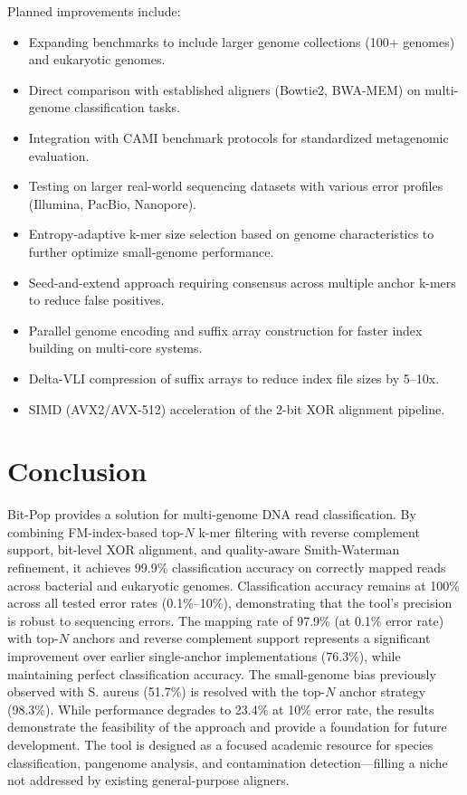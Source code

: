 \documentclass[utf8]{article}
\begin{document}
Planned improvements include:
\begin{itemize}
    \item Expanding benchmarks to include larger genome collections (100+ genomes) and eukaryotic genomes.
    \item Direct comparison with established aligners (Bowtie2, BWA-MEM) on multi-genome classification tasks.
    \item Integration with CAMI benchmark protocols for standardized metagenomic evaluation.
    \item Testing on larger real-world sequencing datasets with various error profiles (Illumina, PacBio, Nanopore).
    \item Entropy-adaptive k-mer size selection based on genome characteristics to further optimize small-genome performance.
    \item Seed-and-extend approach requiring consensus across multiple anchor k-mers to reduce false positives.
    \item Parallel genome encoding and suffix array construction for faster index building on multi-core systems.
    \item Delta-VLI compression of suffix arrays to reduce index file sizes by 5--10x.
    \item SIMD (AVX2/AVX-512) acceleration of the 2-bit XOR alignment pipeline.
\end{itemize}

\section{Conclusion}

Bit-Pop provides a solution for multi-genome DNA read classification. By combining FM-index-based top-$N$ k-mer filtering with reverse complement support, bit-level XOR alignment, and quality-aware Smith-Waterman refinement, it achieves 99.9\% classification accuracy on correctly mapped reads across bacterial and eukaryotic genomes. Classification accuracy remains at 100\% across all tested error rates (0.1\%--10\%), demonstrating that the tool's precision is robust to sequencing errors. The mapping rate of 97.9\% (at 0.1\% error rate) with top-$N$ anchors and reverse complement support represents a significant improvement over earlier single-anchor implementations (76.3\%), while maintaining perfect classification accuracy. The small-genome bias previously observed with S. aureus (51.7\%) is resolved with the top-$N$ anchor strategy (98.3\%). While performance degrades to 23.4\% at 10\% error rate, the results demonstrate the feasibility of the approach and provide a foundation for future development. The tool is designed as a focused academic resource for species classification, pangenome analysis, and contamination detection---filling a niche not addressed by existing general-purpose aligners.
\end{document}
